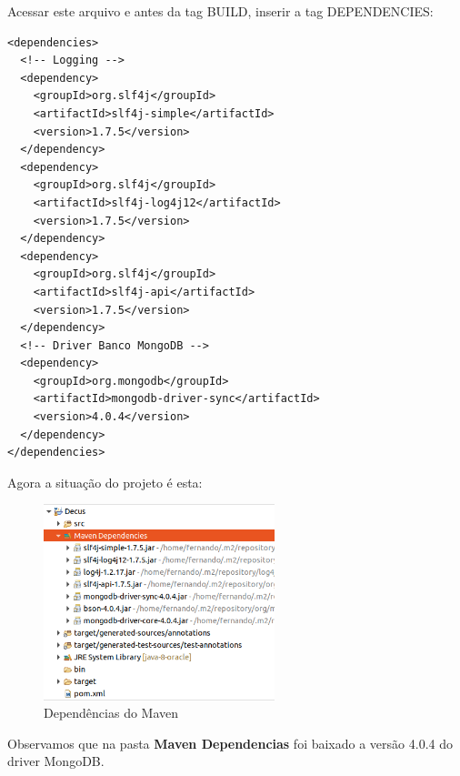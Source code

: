 Acessar este arquivo e antes da tag BUILD, inserir a tag DEPENDENCIES:
\begin{lstlisting}[]
<dependencies>
  <!-- Logging -->
  <dependency>
    <groupId>org.slf4j</groupId>
    <artifactId>slf4j-simple</artifactId>
    <version>1.7.5</version>
  </dependency>
  <dependency>
    <groupId>org.slf4j</groupId>
    <artifactId>slf4j-log4j12</artifactId>
    <version>1.7.5</version>
  </dependency>
  <dependency>
    <groupId>org.slf4j</groupId>
    <artifactId>slf4j-api</artifactId>
    <version>1.7.5</version>
  </dependency>
  <!-- Driver Banco MongoDB -->
  <dependency>
    <groupId>org.mongodb</groupId>
    <artifactId>mongodb-driver-sync</artifactId>
    <version>4.0.4</version>
  </dependency>
</dependencies>
\end{lstlisting}

Agora a situação do projeto é esta:
\begin{figure}[H]
	\centering
	\includegraphics[width=0.6\textwidth]{imagens/dependenciasMaven.png}
	\caption{Dependências do Maven}
\end{figure}

Observamos que na pasta \textbf{Maven Dependencias} foi baixado a versão 4.0.4 do driver MongoDB.


